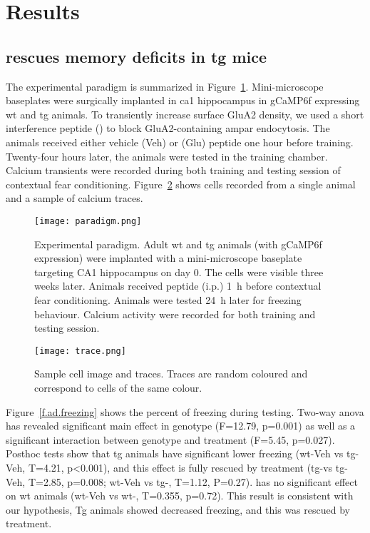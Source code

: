 \section{Results}


\subsection{\tglu rescues memory deficits in \gls{tg} mice}
The experimental paradigm is summarized in Figure~\ref{f.ad.paradigm}. Mini-microscope baseplates were surgically implanted in \gls{ca1} hippocampus in gCaMP6f expressing \gls{wt} and \gls{tg} animals. To transiently increase surface GluA2 density, we used a short interference peptide (\tglu) to block GluA2-containing \gls{ampar} endocytosis. The animals received either vehicle (Veh) or \tglu (Glu) peptide one hour before training. Twenty-four hours later, the animals were tested in the training chamber. Calcium transients were recorded during both training and testing session of contextual fear conditioning. Figure~\ref{f.ad.trace} shows cells recorded from a single animal and a sample of calcium traces. 
\begin{figure}[h]
    \texttt{[image: paradigm.png]}
    \caption{Experimental paradigm. Adult \gls{wt} and \gls{tg} animals (with gCaMP6f expression) were implanted with a mini-microscope baseplate targeting CA1 hippocampus on day 0. The cells were visible three weeks later. Animals received \tglu peptide (i.p.) \SI{1}{\hour} before contextual fear conditioning. Animals were tested \SI{24}{\hour} later for freezing behaviour. Calcium activity were recorded for both training and testing session. \label{f.ad.paradigm}}
\end{figure}

\begin{figure}[h]
    \texttt{[image: trace.png]}
    \caption{Sample cell image and traces. Traces are random coloured and correspond to cells of the same colour. \label{f.ad.trace}}
\end{figure}


Figure~\ref{f.ad.freezing} shows the percent of freezing during testing. Two-way \gls{anova} has revealed significant main effect in genotype (F=12.79, p=0.001) as well as a significant interaction between genotype and treatment (F=5.45, p=0.027). Posthoc tests show that \gls{tg} animals have significant lower freezing (\gls{wt}-Veh vs \gls{tg}-Veh, T=4.21, p<0.001), and this effect is fully rescued by \tglu treatment (\gls{tg}-\glu vs \gls{tg}-Veh, T=2.85, p=0.008; \gls{wt}-Veh vs \gls{tg}-\glu, T=1.12, P=0.27). \tglu has no significant effect on \gls{wt} animals (\gls{wt}-Veh vs \gls{wt}-\glu, T=0.355, p=0.72). This result is consistent with our hypothesis, Tg animals showed decreased freezing, and this was rescued by \tglu treatment. 

